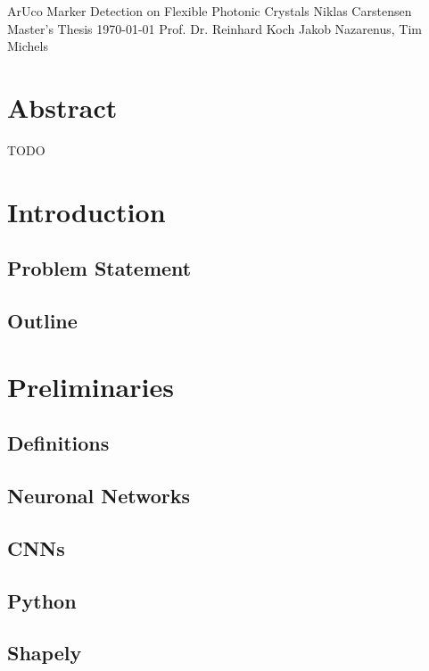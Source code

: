 \documentclass[10pt]{book}
\newcommand*\NewPage{\newpage\null\thispagestyle{empty}\newpage}
\begin{document}
\frontmatter

\studtitlepage%
{ArUco Marker Detection on Flexible Photonic Crystals}%
{}
{Niklas Carstensen}%
{Master's Thesis}%
{\today}%
{Prof. Dr. Reinhard Koch}%
{Jakob Nazarenus, Tim Michels}%
\NewPage{}
\setcounter{page}{2}
\studeidesstatt
\NewPage{}

\setcounter{page}{3}
\chapter*{Abstract}
TODO

\tableofcontents
\listoffigures
\mainmatter
\chapter{Introduction}

\section{Problem Statement}

\section{Outline}

\chapter{Preliminaries}
\label{chap:prelim}

\section{Definitions}

\section{Neuronal Networks}

\section{CNNs}

\section{Python}

\section{Shapely}
\end{document}
